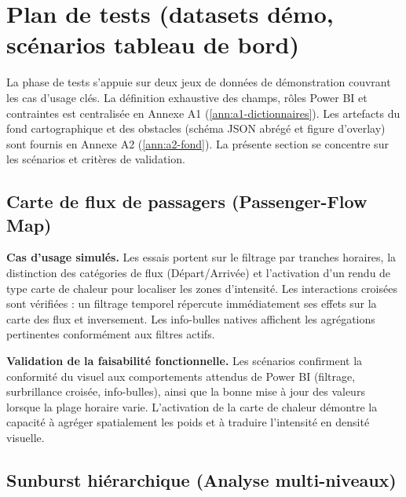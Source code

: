 \section{Plan de tests (datasets démo, scénarios tableau de bord)}
\label{sec:test-plan}

La phase de tests s’appuie sur deux jeux de données de démonstration couvrant les cas d’usage clés. La définition exhaustive des champs, rôles Power BI et contraintes est centralisée en Annexe A1 (\autoref{ann:a1-dictionnaires}). Les artefacts du fond cartographique et des obstacles (schéma JSON abrégé et figure d’overlay) sont fournis en Annexe A2 (\autoref{ann:a2-fond}). La présente section se concentre sur les scénarios et critères de validation.

\subsection{Carte de flux de passagers (Passenger-Flow Map)}
\label{subsec:test-flowmap}

\textbf{Cas d’usage simulés.} Les essais portent sur le filtrage par tranches horaires, la distinction des catégories de flux (Départ/Arrivée) et l’activation d’un rendu de type carte de chaleur pour localiser les zones d’intensité. Les interactions croisées sont vérifiées : un filtrage temporel répercute immédiatement ses effets sur la carte des flux et inversement. Les info-bulles natives affichent les agrégations pertinentes conformément aux filtres actifs.

\textbf{Validation de la faisabilité fonctionnelle.} Les scénarios confirment la conformité du visuel aux comportements attendus de Power BI (filtrage, surbrillance croisée, info-bulles), ainsi que la bonne mise à jour des valeurs lorsque la plage horaire varie. L’activation de la carte de chaleur démontre la capacité à agréger spatialement les poids et à traduire l’intensité en densité visuelle.

\subsection{Sunburst hiérarchique (Analyse multi-niveaux)}
\label{subsec:test-sunburst}


